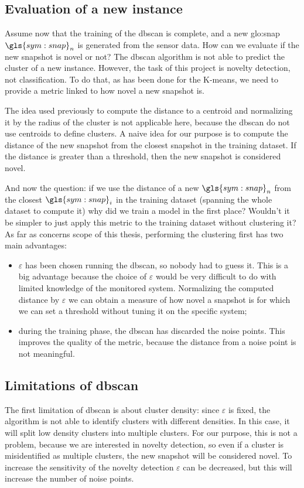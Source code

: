 \subsection{Evaluation of a new instance}
\label{sec:dbscan_eval}
Assume now that the training of the \gls{dbscan} is complete, and a new \gls{glo:snap} $\gls{sym:snap}_n$ is generated from the sensor data. How can we evaluate if the new snapshot is novel or not?
The \gls{dbscan} algorithm is not able to predict the cluster of a new instance. However, the task of this project is novelty detection, not classification.
To do that, as has been done for the K-means, we need to provide a metric linked to how novel a new snapshot is. 

The idea used previously to compute the distance to a centroid and normalizing it by the radius of the cluster is not applicable here, because the \gls{dbscan} do not use centroids to define clusters. A naive idea for our purpose is to compute the distance of the new snapshot from the closest snapshot in the training dataset.
If the distance is greater than a threshold, then the new snapshot is considered novel.

And now the question: if we use the distance of a new $\gls{sym:snap}_n$ from the closest $\gls{sym:snap}_i$ in the training dataset (spanning the whole dataset to compute it) why did we train a model in the first place? Wouldn't it be simpler to just apply this metric to the training dataset without clustering it? As far as concerns scope of this thesis, performing the clustering first has two main advantages:
\begin{itemize}
    \item $\varepsilon$ has been chosen running the \gls{dbscan}, so nobody had to guess it. This is a big advantage because the choice of $\varepsilon$ would be very difficult to do with limited knowledge of the monitored system. Normalizing the computed distance by $\varepsilon$ we can obtain a measure of how novel a snapshot is for which we can set a threshold without tuning it on the specific system;
    \item during the training phase, the \gls{dbscan} has discarded the noise points. This improves the quality of the metric, because the distance from a noise point is not meaningful.
\end{itemize}

\subsection{Limitations of \gls{dbscan}}
The first limitation of \gls{dbscan} is about cluster density: since $\varepsilon$ is fixed, the algorithm is not able to identify clusters with different densities. In this case, it will split low density clusters into multiple clusters. For our purpose, this is not a problem, because we are interested in novelty detection, so even if a cluster is misidentified as multiple clusters, the new snapshot will be considered novel. To increase the sensitivity of the novelty detection $\varepsilon$ can be decreased, but this will increase the number of noise points.

